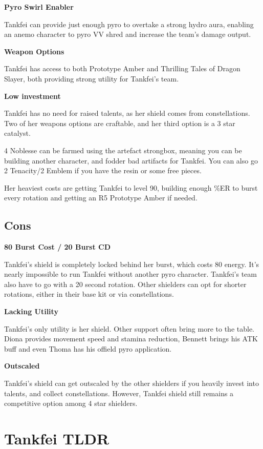\documentclass[11pt]{article}
\begin{document}
\textbf{Pyro Swirl Enabler}

Tankfei can provide just enough pyro to overtake a strong hydro aura, enabling an anemo character to pyro VV shred and increase the team's damage output.

\textbf{Weapon Options}

Tankfei has access to both Prototype Amber and Thrilling Tales of Dragon Slayer, both providing strong utility for Tankfei's team.

\textbf{Low investment}

Tankfei has no need for raised talents, as her shield comes from constellations. Two of her weapons options are craftable, and her third option is a 3 star catalyst. 

4 Noblesse can be farmed using the artefact strongbox, meaning you can be building another character, and fodder bad artifacts for Tankfei. You can also go 2 Tenacity/2 Emblem if you have the resin or some free pieces.

Her heaviest costs are getting Tankfei to level 90, building enough \%ER to burst every rotation and getting an R5 Prototype Amber if needed. 

\subsection{Cons}

\textbf{80 Burst Cost / 20 Burst CD}

Tankfei's shield is completely locked behind her burst, which costs 80 energy. It's nearly impossible to run Tankfei without another pyro character. Tankfei's team also have to go with a 20 second rotation. Other shielders can opt for shorter rotations, either in their base kit or via constellations.

\textbf{Lacking Utility}

Tankfei's only utility is her shield. Other support often bring more to the table. Diona provides movement speed and stamina reduction, Bennett brings his ATK buff and even Thoma has his offield pyro application. 

\textbf{Outscaled}

Tankfei's shield can get outscaled by the other shielders if you heavily invest into talents, and collect constellations. However, Tankfei shield still remains a competitive option among 4 star shielders.



\section{Tankfei TLDR}
\end{document}
